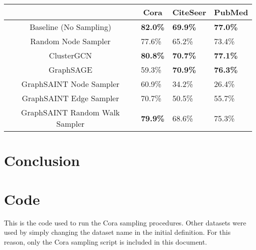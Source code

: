 \documentclass{article}
\begin{document}
	\begin{table}
		\centering
		\begin{tabular}{c|l|l|l|}
			\cline{2-4}
			& \multicolumn{1}{c|}{Cora} & \multicolumn{1}{c|}{CiteSeer} & PubMed          \\ \hline
			\multicolumn{1}{|c|}{Baseline (No Sampling)}         & \textbf{82.0\%}           & \textbf{69.9\%}               & \textbf{77.0\%} \\ \hline
			\multicolumn{1}{|c|}{Random Node Sampler}            & 77.6\%                    & 65.2\%                        & 73.4\%          \\ \hline
			\multicolumn{1}{|c|}{ClusterGCN}                     & \textbf{80.8\%}           & \textbf{70.7\%}               & \textbf{77.1\%} \\ \hline
			\multicolumn{1}{|c|}{GraphSAGE}                      & 59.3\%                    & \textbf{70.9\%}               & \textbf{76.3\%} \\ \hline
			\multicolumn{1}{|c|}{GraphSAINT Node Sampler}        & 60.9\%                    & 34.2\%                        & 26.4\%          \\ \hline
			\multicolumn{1}{|c|}{GraphSAINT Edge Sampler}        & 70.7\%                    & 50.5\%                        & 55.7\%          \\ \hline
			\multicolumn{1}{|c|}{GraphSAINT Random Walk Sampler} & \textbf{79.9\%}           & 68.6\%                        & 75.3\%          \\ \hline
		\end{tabular}
	\end{table}

	
	
	\section{Conclusion}
	\pagebreak
	\appendix
	\section{Code}
	This is the code used to run the Cora sampling procedures. Other datasets were used by simply changing the dataset name in the initial definition. For this reason, only the Cora sampling script is included in this document. 
	
	

	
\end{document}
